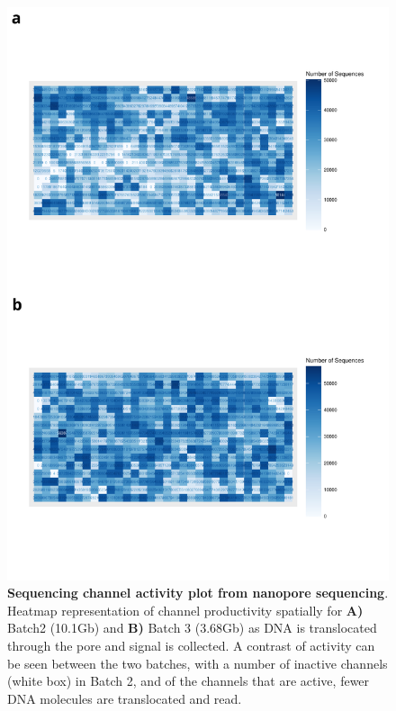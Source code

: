 \begin{figure}[htp]
	\begin{center}
		\includegraphics[page=1,trim={0 4cm 0 0},scale = 0.45]{Figures/ONTTargetedTranscriptome.pdf}
	\end{center}
	\captionsetup{width=0.95\textwidth}
	\caption[ONT Sequence Channel Activity from Whole Transcriptome Sequencing ]%
	{\textbf{Sequencing channel activity plot from nanopore sequencing}. Heatmap representation of channel productivity spatially for \textbf{A)} Batch2 (10.1Gb) and \textbf{B)} Batch 3 (3.68Gb) as DNA is translocated through the pore and signal is collected. A contrast of activity can be seen between the two batches, with a number of inactive channels (white box) in Batch 2, and of the channels that are active, fewer DNA molecules are translocated and read.}
	\label{fig:ont_targetedseq_channel}
\end{figure}

